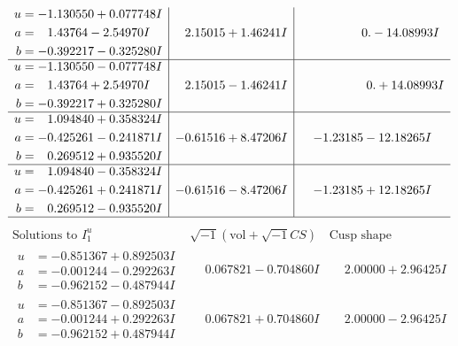 \documentclass[1p]{elsarticle_modified}
\theoremstyle{definition}
\newcommand{\I}{\sqrt{-1}}
\begin{document}
$$\begin{array}{c|c|c}
\begin{aligned}
u &= -1.130550 + 0.077748 I \\
a &= \phantom{-}1.43764 - 2.54970 I \\
b &= -0.392217 - 0.325280 I\end{aligned}
 & \phantom{-}2.15015 + 1.46241 I & \phantom{-0.000000 } 0. - 14.08993 I \\ \hline\begin{aligned}
u &= -1.130550 - 0.077748 I \\
a &= \phantom{-}1.43764 + 2.54970 I \\
b &= -0.392217 + 0.325280 I\end{aligned}
 & \phantom{-}2.15015 - 1.46241 I & \phantom{-0.000000 -}0. + 14.08993 I \\ \hline\begin{aligned}
u &= \phantom{-}1.094840 + 0.358324 I \\
a &= -0.425261 - 0.241871 I \\
b &= \phantom{-}0.269512 + 0.935520 I\end{aligned}
 & -0.61516 + 8.47206 I & -1.23185 - 12.18265 I \\ \hline\begin{aligned}
u &= \phantom{-}1.094840 - 0.358324 I \\
a &= -0.425261 + 0.241871 I \\
b &= \phantom{-}0.269512 - 0.935520 I\end{aligned}
 & -0.61516 - 8.47206 I & -1.23185 + 12.18265 I\\
 \hline 
 \end{array}$$\newpage$$\begin{array}{c|c|c}  
\text{Solutions to }I^u_{1}& \I (\text{vol} + \sqrt{-1}CS) & \text{Cusp shape}\\
 \hline 
\begin{aligned}
u &= -0.851367 + 0.892503 I \\
a &= -0.001244 - 0.292263 I \\
b &= -0.962152 - 0.487944 I\end{aligned}
 & \phantom{-}0.067821 - 0.704860 I & \phantom{-}2.00000 + 2.96425 I \\ \hline\begin{aligned}
u &= -0.851367 - 0.892503 I \\
a &= -0.001244 + 0.292263 I \\
b &= -0.962152 + 0.487944 I\end{aligned}
 & \phantom{-}0.067821 + 0.704860 I & \phantom{-}2.00000 - 2.96425 I \\ \hline\begin{aligned}

\end{aligned}
\end{array}$$
\end{document}
